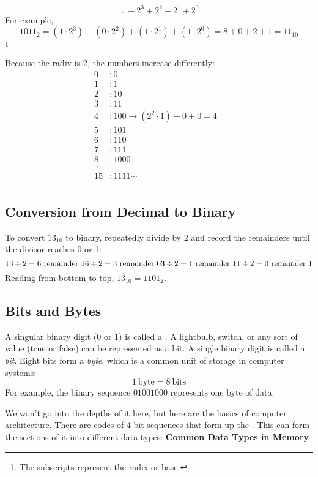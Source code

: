 \[
  \dots + 2^3 + 2^2 + 2^1 + 2^0
\]
For example,
\[
1011_2 = (1 \cdot 2^3) + (0 \cdot 2^2) + (1 \cdot 2^1) + (1 \cdot 2^0) = 8 + 0 + 2 + 1 = 11_{10}
\]\footnote{The subscripts represent the radix or base.}

Because the radix is 2, the numbers increase differently:
\begin{align*}
  0&: 0 \\
  1&: 1 \\
  2&: 10 \\
  3&: 11 \\
  4&: 100 \rightarrow (2^{2}\cdot 1) + 0 + 0 = 4 \\
  5&: 101 \\
  6&: 110 \\
  7&: 111 \\
  8&: 1000 \\
  \cdots& \\
  15&: 1111
  \cdots& \\
\end{align*}

\subsection*{Conversion from Decimal to Binary}
To convert $13_{10}$ to binary, repeatedly divide by $2$ and record the remainders until the divisor reaches 0 or 1:
\[
13 \div 2 = 6 \text{ remainder } 1 \\
6 \div 2 = 3 \text{ remainder } 0 \\
3 \div 2 = 1 \text{ remainder } 1 \\
1 \div 2 = 0 \text{ remainder } 1
\]
Reading from bottom to top, $13_{10} = 1101_2$.

\subsection{Bits and Bytes}
A singular binary digit (0 or 1) is called a . 
A lightbulb, switch, or any sort of  value (true or false) can be represented as a bit.
A single binary digit is called a \emph{bit}. 
Eight bits form a \emph{byte}, which is a common unit of storage in computer systems:
\[
1\ \text{byte} = 8\ \text{bits}
\]
For example, the binary sequence $01001000$ represents one byte of data.

We won't go into the depths of it here, but here are the basics of computer architecture. 
There are codes of 4-bit sequences that form up the . 
This can form the sections of it into different data types:
\textbf{Common Data Types in Memory}

